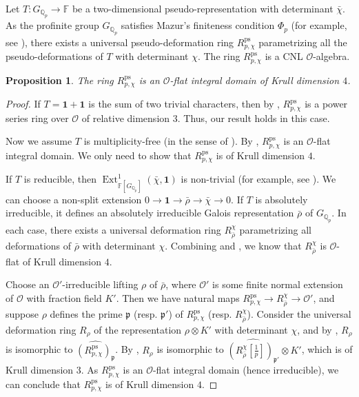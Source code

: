 \documentclass[a4paper, 12pt]{amsart}
\newtheorem{prop}[thm]{Proposition}
\def\ps{\mathrm{ps}}
\newcommand{\F}{\mathbb{F}}
\newcommand{\Q}{\mathbb{Q}}
\newcommand{\cO}{\mathcal{O}}
\newcommand{\kp}{\mathfrak{p}}
\begin{document}
	Let $T: G_{\Q_p} \to \F$ be a two-dimensional pseudo-representation with determinant $\bar{\chi}$. As the profinite group $ G_{\Q_p}$ satisfies Mazur's finiteness condition $\Phi_p$ (for example, see \cite[Theorem 7.5.12]{Neukirch_2008}), there exists a universal pseudo-deformation ring $R_{p, \chi}^{\ps}$ parametrizing all the pseudo-deformations of $T$ with determinant $\chi$. The ring $R_{p, \chi}^{\ps}$ is a CNL $\cO$-algebra.
	
	\begin{prop}\label{local pseudo}
		The ring $R_{p, \chi}^{\ps}$ is an $\cO$-flat integral domain of Krull dimension $4$.
	\end{prop}
	
	\begin{proof}
		If $T=\mathbf{1}+\mathbf{1}$ is the sum of two trivial characters, then by \cite[Corollary 9.13]{Pa_k_nas_2013}, $R_{p, \chi}^{\ps}$ is a power series ring over $\cO$ of relative dimension $3$. Thus, our result holds in this case.
		
		Now we assume $T$ is multiplicity-free (in the sense of \cite[Definition 1.4.1]{bc09}). By \cite[Corollary 5.11]{B_ckle_2023}, $R_{p, \chi}^{\ps}$ is an $\cO$-flat integral domain. We only need to show that $R_{p, \chi}^{\ps}$ is of Krull dimension $4$.
		
		If $T$ is reducible, then $\operatorname{Ext}_{\F[G_{\Q_p}]}^1 (\bar{\chi}, \mathbf{1})$ is non-trivial (for example, see \cite[Theorem 7.3.2]{Neukirch_2008}). We can choose a non-split extension $0 \to \mathbf{1} \to \bar{\rho} \to \bar{\chi} \to 0$. If $T$ is absolutely irreducible, it defines an absolutely irreducible Galois representation $\bar{\rho} $ of $ G_{\Q_p}$. In each case, there exists a universal deformation ring $R_{\bar{\rho}}^{\chi}$ parametrizing all deformations of $\bar{\rho}$ with determinant $\chi$. Combining \cite[Theorem 1.5]{B_ckle_2023} and \cite[Proposition 2.1]{Khare_2009}, we know that  $R_{\bar{\rho}}^{\chi}$ is $\cO$-flat of Krull dimension $4$. 
		
		Choose an $\cO'$-irreducible lifting $\rho$ of $\bar{\rho}$, where $\cO'$ is some finite normal extension of $\cO$ with fraction field $K'$. Then we have natural maps $R_{p, \chi}^{\ps} \to R_{\bar{\rho}}^{\chi} \to \cO' $, and suppose $\rho$ defines the prime $\kp$ (resp. $\kp'$) of $ R_{p, \chi}^{\ps}$ (resp. $ R_{\bar{\rho}}^{\chi}$). Consider the universal deformation ring $R_{\rho}$ of the representation $\rho \otimes K'$ with determinant $\chi$, and by \cite[Corollary 2.2.2]{pan2022fontaine}, $R_{\rho}$ is isomorphic to $ \widehat{(R_{p, \chi}^{\ps})_{\kp}}$. By \cite[Proposition 9.5]{kisin2003overconvergent}, $R_{\rho}$ is isomorphic to $\widehat{(R_{\bar{\rho}}^{\chi}[\frac{1}{p}])_{\kp'}} \otimes K' $, which is of Krull dimension $3$. As $R_{p, \chi}^{\ps}$ is an $\cO$-flat integral domain (hence irreducible), we can conclude that $R_{p, \chi}^{\ps}$ is of Krull dimension $4$.
	\end{proof}
	
\end{document}
